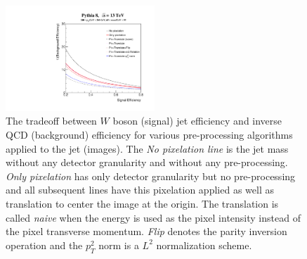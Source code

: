 \begin{figure}[htbp!]
  \begin{center}
        \includegraphics[width=0.5\textwidth]{figures/ROCs_compare.pdf}
      \caption{ The tradeoff between $W$ boson (signal) jet efficiency and inverse QCD (background) efficiency for various pre-processing algorithms applied to the jet (images).  The {\it No pixelation line} is the jet mass without any detector granularity and without any pre-processing.  {\it Only pixelation} has only detector granularity but no pre-processing and all subsequent lines have this pixelation applied as well as translation to center the image at the origin.  The translation is called {\it naive} when the energy is used as the pixel intensity instead of the pixel transverse momentum.  {\it Flip} denotes the parity inversion operation and the $p_T^2$ norm is a $L^2$ normalization scheme.  
      \label{fig:preprocess3} }
    \end{center}
\end{figure}


